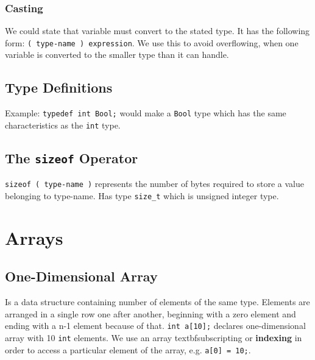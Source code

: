 \documentclass[openany]{book}
\begin{document}
    \subsection*{Casting}
    We could state that variable must convert to the stated type. It has the following
    form: \texttt{( type-name ) expression}. We use this to avoid overflowing, when
    one variable is converted to the smaller type than it can handle.

    \section{Type Definitions}
    Example: \texttt{typedef int Bool;} would make a \texttt{Bool} type which has
    the same characteristics as the \texttt{int} type.

    \section{The \texttt{sizeof} Operator}
    \texttt{sizeof ( type-name )} represents the number of bytes required to store
    a value belonging to type-name. Has type \texttt{size\_t} which is unsigned integer
    type.

    \chapter{Arrays}

    \section{One-Dimensional Array}
    Is a data structure containing number of elements of the same type. Elements
    are arranged in a single row one after another, beginning with a zero element
    and ending with a n-1 element because of that. \texttt{int a[10];} declares
    one-dimensional array with 10 \texttt{int} elements. We use an array 
    textbf{subscripting} or \textbf{indexing} in order to access a particular
    element of the array, e.g. \texttt{a[0] = 10;}.
\end{document}
